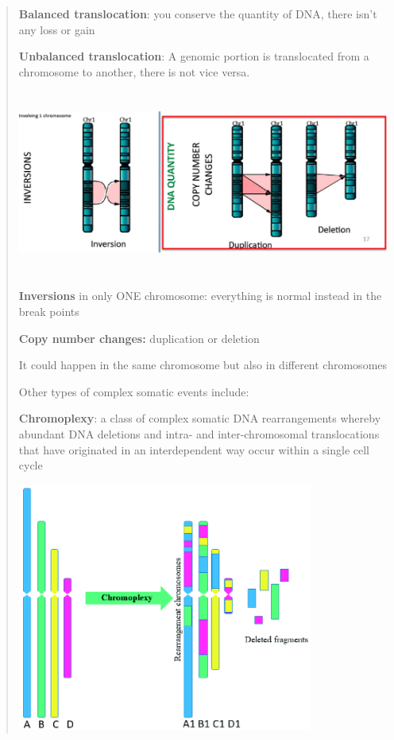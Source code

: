 \begin{quote}
\textbf{Balanced translocation}: you conserve the quantity of DNA, there
isn't any loss or gain

\textbf{Unbalanced translocation}: A genomic portion is translocated
from a chromosome to another, there is not vice versa.

\includegraphics[width=6.22722in,height=2.39062in]{image7.jpeg}

\textbf{Inversions} in only ONE chromosome: everything is normal instead
in the break points

\textbf{Copy number changes:} duplication or deletion

It could happen in the same chromosome but also in different chromosomes

Other types of complex somatic events include:

\textbf{Chromoplexy}: a class of complex somatic DNA rearrangements
whereby abundant DNA deletions and intra- and inter-chromosomal
translocations that have originated in an interdependent way occur
within a single cell cycle

\includegraphics[width=3.81944in,height=3.21433in]{image8.png}


\end{quote}
